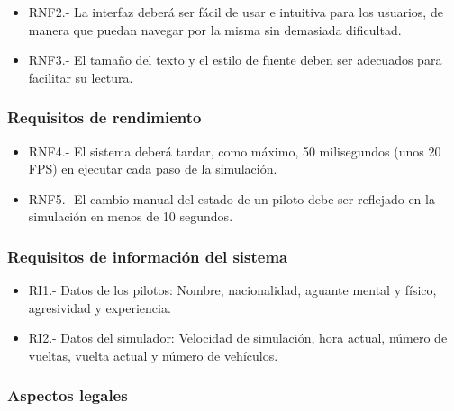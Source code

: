 \begin{itemize}
    \item RNF2.- La interfaz deberá ser fácil de usar e intuitiva para los usuarios, de manera que puedan navegar por la misma sin demasiada dificultad.
    \item RNF3.- El tamaño del texto y el estilo de fuente deben ser adecuados para facilitar su lectura.
\end{itemize}

\subsubsection{Requisitos de rendimiento}

\begin{itemize}
    \item RNF4.- El sistema deberá tardar, como máximo, 50 milisegundos (unos 20 FPS) en ejecutar cada paso de la simulación.
    \item RNF5.- El cambio manual del estado de un piloto debe ser reflejado en la simulación en menos de 10 segundos.
\end{itemize}

\subsubsection{Requisitos de información del sistema}

\begin{itemize}
    \item RI1.- Datos de los pilotos: Nombre, nacionalidad, aguante mental y físico, agresividad y experiencia.
    \item RI2.- Datos del simulador: Velocidad de simulación, hora actual, número de vueltas, vuelta actual y número de vehículos.
\end{itemize}

\subsubsection{Aspectos legales}

